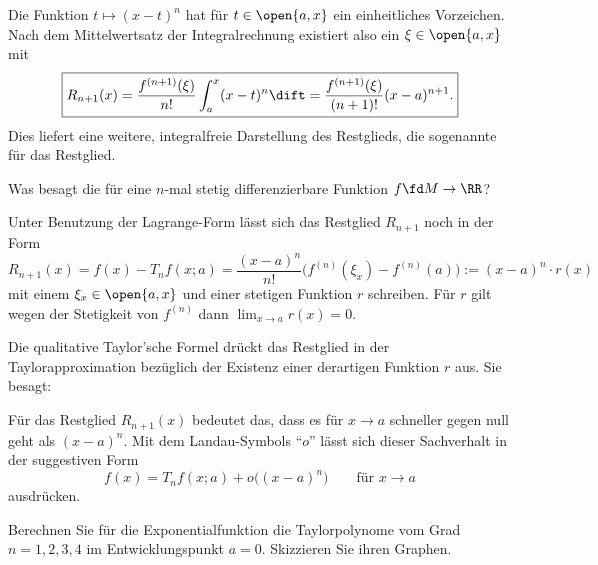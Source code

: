 \begin{antwort}
  Die Funktion $t\mapsto (x-t)^n$ hat für $t\in \open{a,x}$ 
  ein einheitliches Vorzeichen. Nach dem Mittelwertsatz der 
  Integralrechnung existiert also ein $\xi \in  \open{a,x}$ mit
  \[
  \boxed{R_{n+1} (x) = \frac{f^{(n+1)}(\xi)}{ n! } \int_a^x (x-t)^n \dift
    =  \frac{f^{(n+1)}(\xi)}{ (n+1)! }  (x-a)^{n+1}.} 
  \]
  Dies liefert eine weitere, integralfreie Darstellung des Restglieds, 
  die sogenannte  für das Restglied.
  \AntEnd
\end{antwort}

\begin{frage}
  Was besagt die  
  für eine $n$-mal stetig differenzierbare 
  Funktion $f\fd M \to \RR$?
\end{frage}

\begin{antwort}
  Unter Benutzung der Lagrange-Form lässt sich das Restglied 
  $R_{n+1}$ noch in der Form   
  \[
  R_{n+1}(x)= 
  f(x)-T_n f(x;a)=
  \frac{(x-a)^n}{n!} \big( f^{(n)}( \xi_x ) - f^{(n)} (a) \big) 
  := (x-a)^n \cdot r(x)
  \]
  mit einem $\xi_x \in \open{a,x}$ und einer stetigen 
  Funktion $r$ schreiben. Für $r$ gilt wegen der
  Stetigkeit von $f^{(n)}$ dann $\lim_{x\to a} r(x)=0$. 

  Die qualitative Taylor'sche Formel drückt das Restglied 
  in der Taylorapproximation bezüglich der 
  Existenz einer derartigen Funktion $r$ aus. 
  Sie besagt: 

  \medskip
  \noindent{}

  \medskip\noindent
  Für das Restglied $R_{n+1}(x)$ bedeutet das, dass es 
  für $x\to a$ schneller gegen null geht als $(x-a)^n$. 
  Mit dem Landau-Symbols "`$o$"' 
  lässt sich dieser Sachverhalt in der suggestiven Form
  \[
  \boxed{f(x)=T_n f (x;a)+ o \big( (x-a)^n \big)\qquad\text{für $x\to a$}}
  \]
  ausdrücken.
  \AntEnd
\end{antwort}

\begin{frage}
  Berechnen Sie für die Exponentialfunktion 
  die Taylorpolynome vom Grad $n=1,2,3,4$ 
  im Entwicklungspunkt $a=0$. 
  Skizzieren Sie ihren Graphen.
\end{frage}


